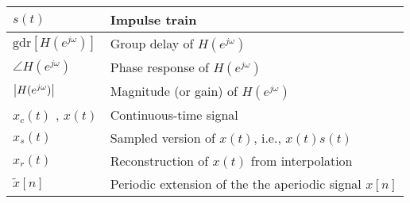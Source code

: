 \begin{xltabular}{\textwidth}{XX}
	\(s(t)\)                                                                                        & Impulse train                                                                                                                                                                                               \\ \hline
	\(\textrm{gdr}\left[ H (e^{j\omega}) \right]\) \cite{oppenheimDiscreteTimeSignalProcessing2009} & Group delay of \(H (e^{j\omega})\)                                                                                                                                                                          \\ \hline
	\(\angle H (e^{j\omega})\) \cite{oppenheimDiscreteTimeSignalProcessing2009}                     & Phase response of \(H (e^{j\omega})\)                                                                                                                                                                       \\ \hline
	\(\abs{H (e^{j\omega})}\) \cite{oppenheimDiscreteTimeSignalProcessing2009}                      & Magnitude (or gain) of \(H (e^{j\omega})\)                                                                                                                                                                  \\ \hline
	\(x_c(t)\) \cite{oppenheimDiscreteTimeSignalProcessing2009}, \(x(t)\)                           & Continuous-time signal                                                                                                                                                                                      \\ \hline
	\(x_s(t)\)                                                                                      & Sampled version of \(x(t)\), i.e., \(x(t)s(t)\)                                                                                                                                                             \\ \hline
	\(x_r(t)\)                                                                                      & Reconstruction of \(x(t)\) from interpolation                                                                                                                                                               \\ \hline
	\(\tilde{x}[n]\)                                                                                & Periodic extension of the the aperiodic signal \(x[n]\)                                                                                                                                                     \\ \hline
\end{xltabular}
